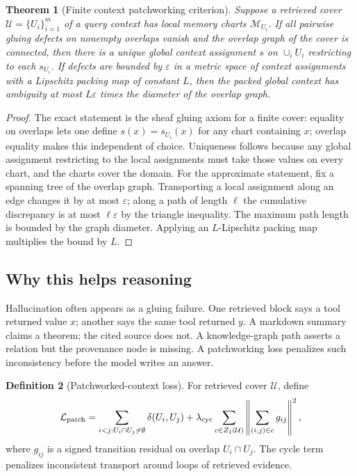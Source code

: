 \documentclass[11pt]{article}
\newtheorem{theorem}{Theorem}[section]
\theoremstyle{definition}
\newtheorem{definition}[theorem]{Definition}
\theoremstyle{remark}
\newcommand{\eps}{\varepsilon}
\begin{document}
\begin{theorem}[Finite context patchworking criterion]
Suppose a retrieved cover \(\mathcal U=\{U_i\}_{i=1}^m\) of a query context has local memory charts \(\mathcal M_{U_i}\). If all pairwise gluing defects on nonempty overlaps vanish and the overlap graph of the cover is connected, then there is a unique global context assignment \(s\) on \(\cup_i U_i\) restricting to each \(s_{U_i}\). If defects are bounded by \(\eps\) in a metric space of context assignments with a Lipschitz packing map of constant \(L\), then the packed global context has ambiguity at most \(L\eps\) times the diameter of the overlap graph.
\end{theorem}
\begin{proof}
The exact statement is the sheaf gluing axiom for a finite cover: equality on overlaps lets one define \(s(x)=s_{U_i}(x)\) for any chart containing \(x\); overlap equality makes this independent of choice. Uniqueness follows because any global assignment restricting to the local assignments must take those values on every chart, and the charts cover the domain. For the approximate statement, fix a spanning tree of the overlap graph. Transporting a local assignment along an edge changes it by at most \(\eps\); along a path of length \(\ell\) the cumulative discrepancy is at most \(\ell\eps\) by the triangle inequality. The maximum path length is bounded by the graph diameter. Applying an \(L\)-Lipschitz packing map multiplies the bound by \(L\).
\end{proof}

\subsection{Why this helps reasoning}

Hallucination often appears as a gluing failure. One retrieved block says a tool returned value \(x\); another says the same tool returned \(y\). A markdown summary claims a theorem; the cited source does not. A knowledge-graph path asserts a relation but the provenance node is missing. A patchworking loss penalizes such inconsistency before the model writes an answer.

\begin{definition}[Patchworked-context loss]
For retrieved cover \(\mathcal U\), define
\[
    \mathcal L_{\rm patch}=\sum_{i<j:U_i\cap U_j\ne\emptyset}\delta(U_i,U_j)+\lambda_{\rm cyc}\sum_{c\in Z_1(\mathcal U)}\left\|\sum_{(i,j)\in c}g_{ij}\right\|^2,
\]
where \(g_{ij}\) is a signed transition residual on overlap \(U_i\cap U_j\). The cycle term penalizes inconsistent transport around loops of retrieved evidence.
\end{definition}
\end{document}
